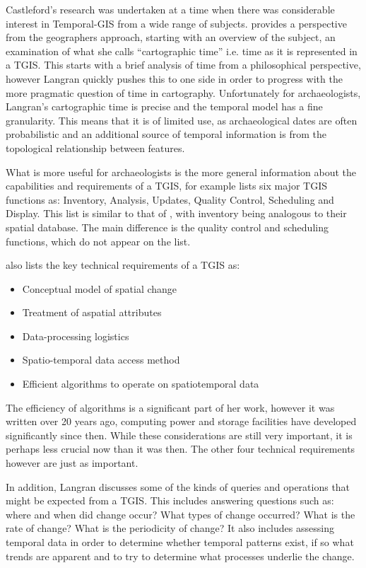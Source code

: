 Castleford's research was undertaken at a time when there was considerable interest in Temporal-GIS from a wide range of subjects. \citet{Langran:1992uq} provides a perspective from the geographers approach, starting with an overview of the subject, an examination of what she calls ``cartographic time''  \cite[27]{Langran:1992uq} i.e. time as it is represented in a TGIS. This starts with a brief analysis of time from a philosophical perspective, however Langran quickly pushes this to one side in order to progress with the more pragmatic question of time in cartography. Unfortunately for archaeologists, Langran's cartographic time is precise and the temporal model has a fine granularity. This means that it is of limited use, as archaeological dates are often probabilistic and an additional source of temporal information is from the topological relationship between features. 

What is more useful for archaeologists is the more general information about the capabilities and requirements of a TGIS, for example \citet{Langran:1992uq} lists six major TGIS functions as: Inventory, Analysis, Updates, Quality Control, Scheduling and Display. This list is similar to that of \citet{Wheatley:2002ly}, with inventory being analogous to their spatial database. The main difference is the quality control and scheduling functions, which do not appear on the \citet{Wheatley:2002ly} list. 

\citet{Langran:1992uq} also lists the key technical requirements of a TGIS as:
\begin{itemize}
\item Conceptual model of spatial change
\item Treatment of aspatial attributes
\item Data-processing logistics
\item Spatio-temporal data access method
\item Efficient algorithms to operate on spatiotemporal data
\end{itemize}
The efficiency of algorithms is a significant part of her work, however it was written over 20 years ago, computing power and storage facilities have developed significantly since then. While these considerations are still very important, it is perhaps less crucial now than it was then. The other four technical requirements however are just as important.

In addition, Langran discusses some of the kinds of queries and operations that might be expected from a TGIS. This includes answering questions such as: where and when did change occur? What types of change occurred? What is the rate of change? What is the periodicity of change? It also includes assessing temporal data in order to determine whether temporal patterns exist, if so what trends are apparent and to try to determine what processes underlie the change.


